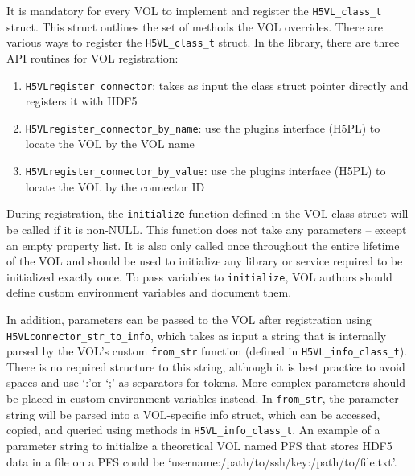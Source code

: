 It is mandatory for every VOL to implement and register the \texttt{H5VL\_class\_t} struct. This struct outlines the set of methods the VOL overrides. There are various ways to register the \texttt{H5VL\_class\_t} struct. In the library, there are three API routines for VOL registration:
\begin{enumerate}
    \item \texttt{H5VLregister\_connector}: takes as input the class struct pointer directly and registers it with HDF5
    \item \texttt{H5VLregister\_connector\_by\_name}: use the plugins interface (H5PL) to locate the VOL by the VOL name
    \item \texttt{H5VLregister\_connector\_by\_value}: use the plugins interface (H5PL) to locate the VOL by the connector ID
\end{enumerate}
During registration, the \texttt{initialize} function defined in the VOL class struct will be called if it is non-NULL. This function does not take any parameters -- except an empty property list. It is also only called once throughout the entire lifetime of the VOL and should be used to initialize any library or service required to be initialized exactly once. To pass variables to \texttt{initialize}, VOL authors should define custom environment variables and document them.

In addition, parameters can be passed to the VOL after registration using \texttt{H5VLconnector\_str\_to\_info}, which takes as input a string that is internally parsed by the VOL's custom \texttt{from\_str} function (defined in \texttt{H5VL\_info\_class\_t}). There is no required structure to this string, although it is best practice to avoid spaces and use `:'or `;' as separators for tokens. More complex parameters should be placed in custom environment variables instead. In \texttt{from\_str}, the parameter string will be parsed into a VOL-specific info struct, which can be accessed, copied, and queried using methods in \texttt{H5VL\_info\_class\_t}. An example of a parameter string to initialize a theoretical VOL named PFS that stores HDF5 data in a file on a PFS could be `username:/path/to/ssh/key:/path/to/file.txt'.

